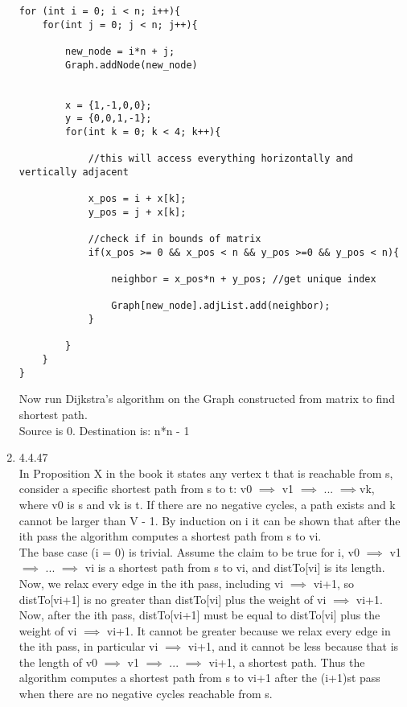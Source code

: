 \documentclass[11pt,fleqn]{article}
\begin{document}
\begin{enumerate}
\begin{verbatim}
for (int i = 0; i < n; i++){
    for(int j = 0; j < n; j++){
    
    	new_node = i*n + j;
    	Graph.addNode(new_node)    	
    	
    	
        x = {1,-1,0,0};
        y = {0,0,1,-1};
        for(int k = 0; k < 4; k++){
        
        	//this will access everything horizontally and vertically adjacent
        	
        	x_pos = i + x[k];
        	y_pos = j + x[k];
        	
        	//check if in bounds of matrix
        	if(x_pos >= 0 && x_pos < n && y_pos >=0 && y_pos < n){
        	
        		neighbor = x_pos*n + y_pos; //get unique index
        		
                Graph[new_node].adjList.add(neighbor);
        	}
	        
        }    
    }
}

\end{verbatim}

Now run Dijkstra's algorithm on the Graph constructed from matrix to find shortest path.\\
Source is 0. Destination is: n*n - 1\\


\item 4.4.47\\


In Proposition X in the book it states any vertex t that is reachable from s, consider a specific shortest path from s to t: v0 $\implies$ v1 
$ \implies $ ... $ \implies $vk, where v0 is s and vk is t. If there are no negative cycles, a path exists and k cannot be larger than V - 1. By induction on i it can be shown that after the ith pass the algorithm computes a shortest path from s to vi.\\

The base case (i = 0) is trivial. Assume the claim to be true for i, v0 $\implies$ v1 $\implies$ ... $\implies$ vi is a shortest path from s to vi, and distTo[vi] is its length. Now, we relax every edge in the ith pass, including vi $\implies$ vi+1, so distTo[vi+1] is no greater than distTo[vi] plus the weight of vi $\implies$ vi+1. Now, after the ith pass, distTo[vi+1] must be equal to distTo[vi] plus the weight of vi $\implies$ vi+1. It cannot be greater because we relax every edge in the ith pass, in particular vi $\implies$ vi+1, and it cannot be less because that is the length of v0 $\implies$ v1 $\implies$ ... $\implies$ vi+1, a shortest path. Thus the algorithm computes a shortest path from s to vi+1 after the (i+1)st pass when there are no negative cycles reachable from s.\\


\end{enumerate}
\end{document}
